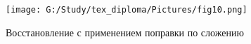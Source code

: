\documentclass[10pt]{beamer}
\begin{document}
\begin{frame}

\begin{minipage}{100mm}
  \begin{figure}[H]
            \texttt{[image: G:/Study/tex\_diploma/Pictures/fig10.png]}
            \label{Pic10}
            \caption[Восстановление с применением поправки по сложению]{Восстановление с применением поправки по сложению}
        \end{figure}
\end{minipage}
\hfill

\end{frame}
\end{document}
